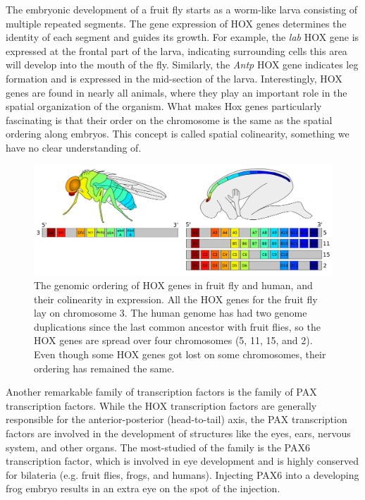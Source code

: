The embryonic development of a fruit fly starts as a worm-like larva consisting of multiple repeated segments. The gene expression of HOX genes determines the identity of each segment and guides its growth. For example, the \textit{lab} HOX gene is expressed at the frontal part of the larva, indicating surrounding cells this area will develop into the mouth of the fly\cite{Hughes2002}. Similarly, the \textit{Antp} HOX gene indicates leg formation and is expressed in the mid-section of the larva. Interestingly, HOX genes are found in nearly all animals, where they play an important role in the spatial organization of the organism. What makes Hox genes particularly fascinating is that their order on the chromosome is the same as the spatial ordering along embryos. This concept is called spatial colinearity, something we have no clear understanding of\cite{Gaunt2015}.

\begin{figure}
    \center
    \includegraphics[width=\linewidth]{ch.introduction/imgs/hox.png}
    \caption{The genomic ordering of HOX genes in fruit fly and human, and their colinearity in expression. All the HOX genes for the fruit fly lay on chromosome 3. The human genome has had two genome duplications since the last common ancestor with fruit flies, so the HOX genes are spread over four chromosomes (5, 11, 15, and 2). Even though some HOX genes got lost on some chromosomes, their ordering has remained the same.}
    \label{fig:hox}
\end{figure}

Another remarkable family of transcription factors is the family of PAX transcription factors. While the HOX transcription factors are generally responsible for the anterior-posterior (head-to-tail) axis, the PAX transcription factors are involved in the development of structures like the eyes, ears, nervous system, and other organs. The most-studied of the family is the PAX6 transcription factor, which is involved in eye development and is highly conserved for bilateria (e.g. fruit flies, frogs, and humans). Injecting PAX6 into a developing frog embryo results in an extra eye on the spot of the injection\cite{Chow1999}.

